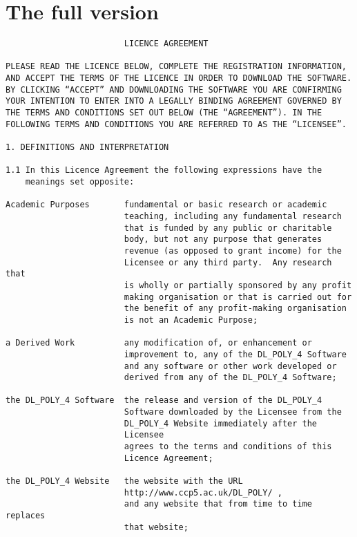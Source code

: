 \section{The full version}
\begin{verbatim}
                        LICENCE AGREEMENT

PLEASE READ THE LICENCE BELOW, COMPLETE THE REGISTRATION INFORMATION,
AND ACCEPT THE TERMS OF THE LICENCE IN ORDER TO DOWNLOAD THE SOFTWARE.
BY CLICKING “ACCEPT” AND DOWNLOADING THE SOFTWARE YOU ARE CONFIRMING
YOUR INTENTION TO ENTER INTO A LEGALLY BINDING AGREEMENT GOVERNED BY
THE TERMS AND CONDITIONS SET OUT BELOW (THE “AGREEMENT”). IN THE
FOLLOWING TERMS AND CONDITIONS YOU ARE REFERRED TO AS THE “LICENSEE”.

1. DEFINITIONS AND INTERPRETATION

1.1 In this Licence Agreement the following expressions have the
    meanings set opposite:

Academic Purposes       fundamental or basic research or academic
                        teaching, including any fundamental research
                        that is funded by any public or charitable
                        body, but not any purpose that generates
                        revenue (as opposed to grant income) for the
                        Licensee or any third party.  Any research that
                        is wholly or partially sponsored by any profit
                        making organisation or that is carried out for
                        the benefit of any profit-making organisation
                        is not an Academic Purpose;

a Derived Work          any modification of, or enhancement or
                        improvement to, any of the DL_POLY_4 Software
                        and any software or other work developed or
                        derived from any of the DL_POLY_4 Software;

the DL_POLY_4 Software  the release and version of the DL_POLY_4
                        Software downloaded by the Licensee from the
                        DL_POLY_4 Website immediately after the
                        Licensee
                        agrees to the terms and conditions of this
                        Licence Agreement;

the DL_POLY_4 Website   the website with the URL
                        http://www.ccp5.ac.uk/DL_POLY/ ,
                        and any website that from time to time replaces
                        that website;


\end{verbatim}
